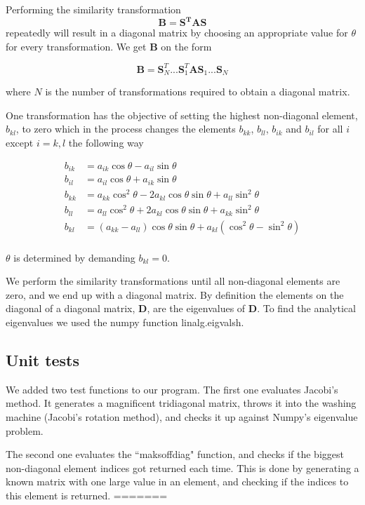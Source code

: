 \documentclass{article}
\begin{document}
Performing the similarity transformation
$$\mathbf{B}=\mathbf{S^TAS}$$
repeatedly will result in a diagonal matrix by choosing an appropriate value for $\theta$ for every transformation. We get $\mathbf{B}$ on the form

$$\mathbf{B}=\mathbf{S}^T_N...\mathbf{S}^T_1\mathbf{A}\mathbf{S}_1...\mathbf{S}_N$$

where $N$ is the number of transformations required to obtain a diagonal matrix.

One transformation has the objective of setting the highest non-diagonal element, $b_{kl}$, to zero which in the process changes the elements $b_{kk}$, $b_{ll}$, $b_{ik}$ and $b_{il}$ for all $i$ except $i=k,l$ the following way

\begin{equation*}
\begin{split}
b_{ik}&=a_{ik}\cos\theta-a_{il}\sin\theta\\
b_{il}&=a_{il}\cos\theta+a_{ik}\sin\theta\\
b_{kk}&=a_{kk}\cos^2\theta-2a_{kl}\cos\theta\sin\theta+a_{ll}\sin^2\theta\\
b_{ll}&=a_{ll}\cos^2\theta+2a_{kl}\cos\theta\sin\theta+a_{kk}\sin^2\theta\\
b_{kl}&=(a_{kk}-a_{ll})\cos\theta\sin\theta+a_{kl}(\cos^2\theta-\sin^2\theta)\\
\end{split}
\end{equation*}

$\theta$ is determined by demanding $b_{kl}=0$.

We perform the similarity transformations until all non-diagonal elements are zero, and we end up with a diagonal matrix. By definition the elements on the diagonal of a diagonal matrix, $\mathbf{D}$, are the eigenvalues of $\mathbf{D}$.
\vskip0.5cm
To find the analytical eigenvalues we used the numpy function linalg.eigvalsh.



\subsection{Unit tests}

We added two test functions to our program. The first one evaluates Jacobi's method. It generates a magnificent tridiagonal matrix, throws it into the washing machine (Jacobi's rotation method), and checks it up against Numpy's eigenvalue problem.

The second one evaluates the ``maksoffdiag" function, and checks if the biggest non-diagonal element indices got returned each time. This is done by generating a known matrix with one large value in an element, and checking if the indices to this element is returned.
=======
\end{document}

